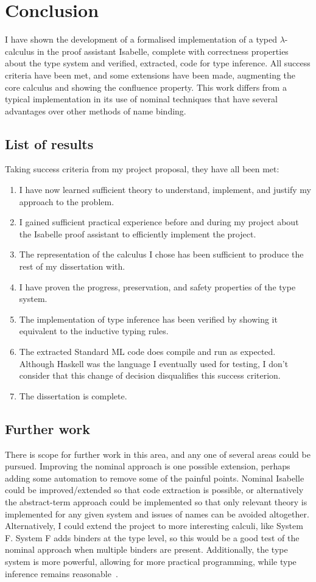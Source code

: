 \chapter{Conclusion}
I have shown the development of a formalised implementation of a typed \(\lambda\)-calculus in the proof assistant Isabelle, complete with correctness properties about the type system and verified, extracted, code for type inference.
All success criteria have been met, and some extensions have been made, augmenting the core calculus and showing the confluence property.
This work differs from a typical implementation in its use of nominal techniques that have several advantages over other methods of name binding.

\section{List of results}
Taking success criteria from my project proposal, they have all been met:
\begin{enumerate}
\item
I have now learned sufficient theory to understand, implement, and justify my approach to the problem.
\item
I gained sufficient practical experience before and during my project about the Isabelle proof assistant to efficiently implement the project.
\item
The representation of the calculus I chose has been sufficient to produce the rest of my dissertation with.
\item
I have proven the progress, preservation, and safety properties of the type system.
\item
The implementation of type inference has been verified by showing it equivalent to the inductive typing rules.
\item
The extracted Standard ML code does compile and run as expected.
Although Haskell was the language I eventually used for testing, I don't consider that this change of decision disqualifies this success criterion.
\item
The dissertation is complete.
\end{enumerate}

\section{Further work}
There is scope for further work in this area, and any one of several areas could be pursued.
Improving the nominal approach is one possible extension, perhaps adding some automation to remove some of the painful points.
Nominal Isabelle could be improved/extended so that code extraction is possible, or alternatively the abstract-term approach could be implemented so that only relevant theory is implemented for any given system and issues of names can be avoided altogether.
Alternatively, I could extend the project to more interesting calculi, like System F.
System F adds binders at the type level, so this would be a good test of the nominal approach when multiple binders are present.
Additionally, the type system is more powerful, allowing for more practical programming, while type inference remains reasonable~\cite{hindley-milner}.

